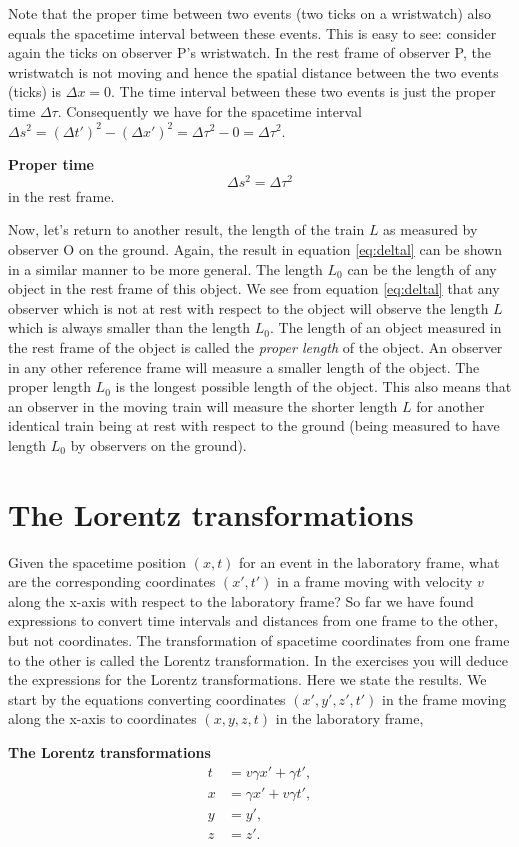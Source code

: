 {\begin{multicols}{2}
Note that the proper time between two events (two ticks on a wristwatch) also equals the spacetime interval between these events. This is easy to see: consider again the ticks on observer P's wristwatch. In the rest frame of observer P, the wristwatch is not moving and hence the spatial distance between the two events (ticks) is $\Delta x=0$. The time interval between these two events is just the proper time $\Delta \tau$. Consequently we have for the spacetime interval $\Delta s^2=(\Delta t')^2-(\Delta x')^2=\Delta \tau^2 - 0=\Delta \tau ^2$. 
\begin{formbox}
\textbf{Proper time}
\[
\Delta s^2 = \Delta \tau^2
\]
in the rest frame.
\end{formbox}

Now, let's return to another result, the length of the train $L$ as measured by observer O on the ground. Again, the result in equation \ref{eq:deltal} can be shown in a similar manner to be more general. The length $L_0$ can be the length of any object in the rest frame of this object. We see from equation \ref{eq:deltal} that {any observer which is not at rest with respect to the object will observe the length $L$ which is always smaller than the length $L_0$}. The length of an object measured in the rest frame of the object is called the {\it proper length} of the object. An observer in any other reference frame will measure a smaller length of the object. The proper length $L_0$ is the longest possible length of the object. This also means that an observer in the moving train will measure the shorter length $L$ for another identical train being at rest with respect to the ground (being measured to have length $L_0$ by observers on the ground).

\section{The Lorentz transformations}
\label{sect:lorentz}

Given the spacetime position $(x,t)$ for an event in the laboratory frame, what are the corresponding coordinates $(x',t')$ in a frame moving with velocity $v$ along the x-axis with respect to the laboratory frame? So far we have found expressions to convert time intervals and distances from one frame to the other, but not coordinates. The transformation of spacetime coordinates from one frame to the other is called the Lorentz transformation. In the exercises you will deduce the expressions for the Lorentz transformations. Here we state the results. We start by the equations converting coordinates $(x',y',z',t')$ in the frame moving along the x-axis to coordinates $(x,y,z,t)$ in the laboratory frame,
\begin{formbox}
\textbf{The Lorentz transformations}
\begin{align}
t&=v\gamma x'+\gamma t',\label{eq:florentz1}\\
x&=\gamma x'+v\gamma t',\label{eq:florentz2}\\
y&=y',\nonumber\\
z&=z'.\nonumber
\end{align}
\end{formbox}


\end{multicols}}
